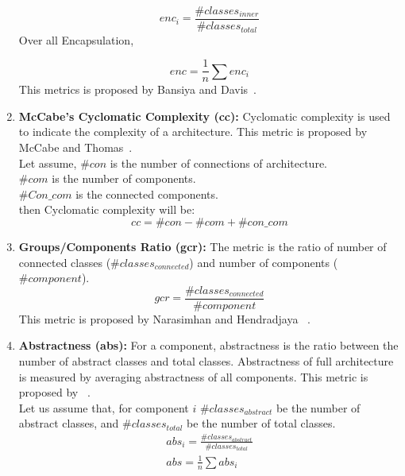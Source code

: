 \documentclass[letterpaper, 10 pt, conference]{ieeeconf}  %
\begin{document}
\begin{enumerate}
 \begin{displaymath}
enc_{i}=\frac{\#classes_{inner}}{\#classes_{total}} 
 \end{displaymath}
Over all Encapsulation,

\begin{equation} \label{enc_eq}
enc=\frac{1}{n}\sum{enc_{i}}
\end{equation}
This metrics is proposed by Bansiya and Davis~\cite{bansiya2002hierarchical}.


\item \textbf{ McCabe's Cyclomatic Complexity (cc):} Cyclomatic complexity is  used to indicate the complexity of a architecture. This metric is proposed by McCabe and Thomas~\cite{mccabe1976complexity}.\\ 
Let assume, $\#con$ is the number of connections of architecture.\\
$\#com$ is the number of components.\\
$\#Con\_com$ is the connected components. \\
then Cyclomatic complexity will be:
\begin{equation}\label{cc_eq}
cc=\#con - \#com + \#con\_com 
\end{equation}

\item \textbf{Groups/Components Ratio (gcr):}
The metric is the ratio of number of connected classes ($\#classes_{connected}$) and number of components ($\#component$).
\begin{equation}
gcr=\frac{\#classes_{connected}}{\#component}
\end{equation}
This metric is proposed by  Narasimhan and Hendradjaya ~\cite{narasimhan2007some}.

\item \textbf{Abstractness (abs): }For a component, abstractness is the ratio between the number of abstract classes and total classes. Abstractness of full architecture is measured by averaging abstractness of all components. This metric is proposed by ~\cite{krogmann2012reconstruction}. \\
Let us assume that, for component $i$ $\#classes_{abstract}$ be the number of abstract classes, and $\#classes_{total}$ be the number of total classes.
\begin{equation}\label{abs_eq}
 \begin{array}{l}
abs_{i}=\frac{\#classes_{abstract}}{\#classes_{total}} \\
abs=\frac{1}{n}\sum{abs_{i}}
\end{array}
\end{equation}








\end{enumerate}
\end{document}
